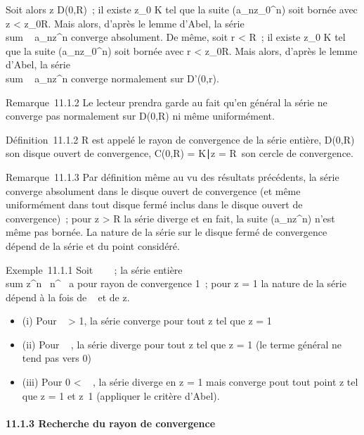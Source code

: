 \documentclass[]{article}
\begin{document}
Soit alors z \in D(0,R)~; il existe z\_0 \in K tel que la suite
(a\_nz\_0^n) soit bornée avec
\textbar{}z\textbar{} \textless{} \textbar{}z\_0\textbar{}\leq R.
Mais alors, d'après le lemme d'Abel, la série
\\sum ~
a\_nz^n converge absolument. De même, soit r
\textless{} R~; il existe z\_0 \in K tel que la suite
(a\_nz\_0^n) soit bornée avec r \textless{}
\textbar{}z\_0\textbar{}\leq R. Mais alors, d'après le lemme
d'Abel, la série \\sum ~
a\_nz^n converge normalement sur D'(0,r).

Remarque~11.1.2 Le lecteur prendra garde au fait qu'en général la série
ne converge pas normalement sur D(0,R) ni même uniformément.

Définition~11.1.2 R est appelé le rayon de convergence de la série
entière, D(0,R) son disque ouvert de convergence, C(0,R) =
\z \in K∣\textbar{}z\textbar{}
= R\ son cercle de convergence.

Remarque~11.1.3 Par définition même au vu des résultats précédents, la
série converge absolument dans le disque ouvert de convergence (et même
uniformément dans tout disque fermé inclus dans le disque ouvert de
convergence)~; pour \textbar{}z\textbar{} \textgreater{} R la série
diverge et en fait, la suite (a\_nz^n) n'est même pas
bornée. La nature de la série sur le disque fermé de convergence dépend
de la série et du point considéré.

Exemple~11.1.1 Soit \alpha~ \in {}~~; la série entière
\\sum   z^n~
\over n^\alpha~ a pour rayon de convergence 1~;
pour \textbar{}z\textbar{} = 1 la nature de la série dépend à la fois de
\alpha~ et de z.

\begin{itemize}
\itemsep1pt\parskip0pt
\item
  (i) Pour \alpha~ \textgreater{} 1, la série converge pour tout z tel que
  \textbar{}z\textbar{} = 1
\item
  (ii) Pour \alpha~ , la série diverge pour tout z tel que
  \textbar{}z\textbar{} = 1 (le terme général ne tend pas vers 0)
\item
  (iii) Pour 0 \textless{} \alpha~ , la série diverge en z = 1 mais
  converge pout tout point z tel que \textbar{}z\textbar{} = 1 et
  z\neq~1 (appliquer le critère d'Abel).
\end{itemize}

\paragraph{11.1.3 Recherche du rayon de convergence}
\end{document}
